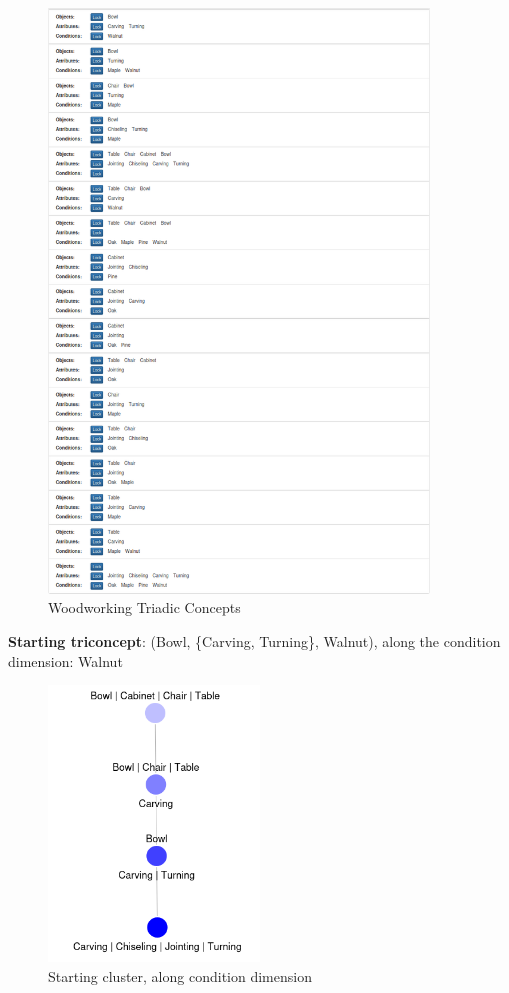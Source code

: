 \documentclass{article}
\begin{document}
\begin{figure}[htbp]
  \centering
  \includegraphics[width=0.9\textwidth]{concepts.png}
  \caption{Woodworking Triadic Concepts}
  \label{fig:context}
\end{figure}

\newpage
\textbf{Starting triconcept}: (Bowl, \{Carving, Turning\}, Walnut), along the condition dimension: Walnut

\begin{figure}[htbp]
  \centering
  \includegraphics[width=0.5\textwidth]{cluster_0.png}
  \caption{Starting cluster, along condition dimension}
  \label{fig:cluster_0}
\end{figure}
\end{document}
